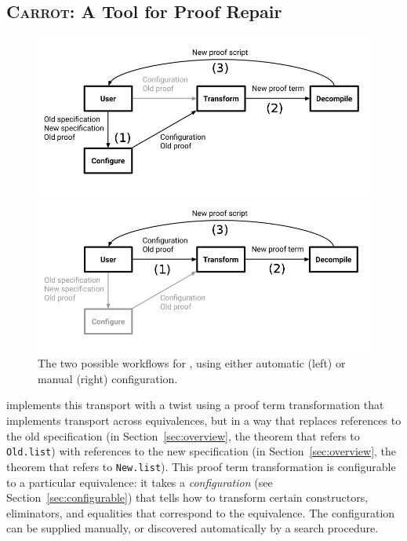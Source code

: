 \subsection{\textsc{Carrot}: A Tool for Proof Repair}
\label{sec:time}

\begin{figure}
\begin{minipage}{0.49\textwidth}
\includegraphics[width=\linewidth]{workflowa.png}
\end{minipage}
\hfill
\begin{minipage}{0.49\textwidth}
\includegraphics[width=\linewidth]{workflowb.png}
\end{minipage}
\vspace{-0.4cm}
\caption{The two possible workflows for \toolname, using either automatic (left) or manual (right) configuration.}
\label{fig:system}
\end{figure}

\toolname implements this transport with a twist using a proof term transformation that implements transport across equivalences,
but in a way that replaces references to the old specification (in Section~\ref{sec:overview}, the theorem that refers to \lstinline{Old.list})
with references to the new specification (in Section~\ref{sec:overview}, the theorem that refers to \lstinline{New.list}).
This proof term transformation is configurable to a particular equivalence:
it takes a \textit{configuration} (see Section~\ref{sec:configurable}) 
that tells \toolname how to transform certain constructors, eliminators, and equalities that 
correspond to the equivalence.
The configuration can be supplied manually, or discovered automatically by a search procedure.


